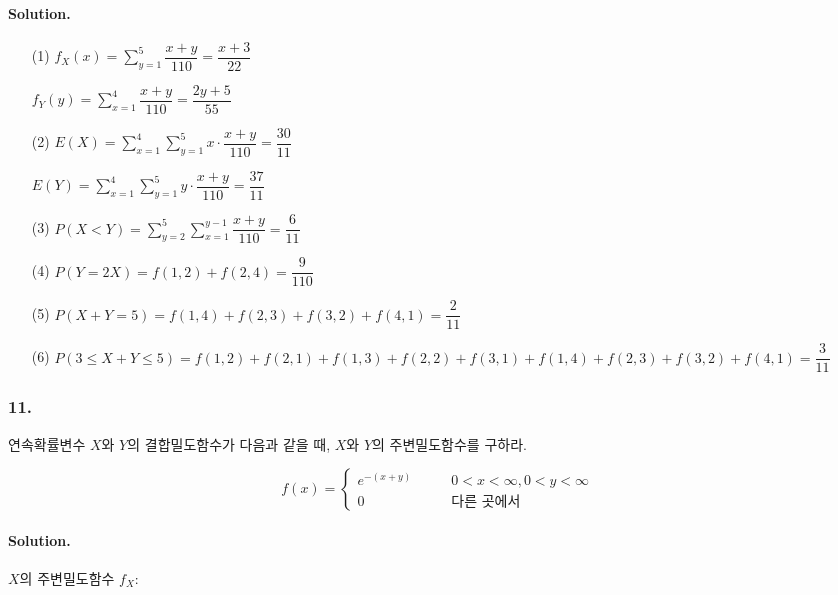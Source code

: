\paragraph{Solution.}
\begin{itemize}
  \item [(1)] $\displaystyle f_X\left(x\right) = \sum_{y=1}^5 \dfrac{x+y}{110} = \dfrac{x+3}{22}$

$\displaystyle f_Y\left(y\right) = \sum_{x=1}^4 \dfrac{x+y}{110} = \dfrac{2y+5}{55}$

  \item [(2)] $\displaystyle E\left(X\right) = \sum_{x=1}^4 \sum_{y=1}^5 x\cdot\dfrac{x+y}{110} = \dfrac{30}{11}$

$\displaystyle E\left(Y\right) = \sum_{x=1}^4 \sum_{y=1}^5 y\cdot\dfrac{x+y}{110} = \dfrac{37}{11}$

  \item [(3)] $\displaystyle P\left(X<Y\right) = \sum_{y=2}^5 \sum_{x=1}^{y - 1} \dfrac{x+y}{110} = \dfrac{6}{11}$
  \item [(4)] $\displaystyle P\left(Y=2X\right) = f\left(1, 2\right) + f\left(2, 4\right) = \dfrac{9}{110}$
  \item [(5)] $P\left(X+Y=5\right) = f\left(1, 4\right) + f\left(2, 3\right) + f\left(3, 2\right) + f\left(4, 1\right) = \dfrac{2}{11}$
  \item [(6)] $P\left(3\leq X+Y\leq 5\right) = f\left(1, 2\right) + f\left(2, 1\right) + f\left(1, 3\right) + f\left(2, 2\right) + f\left(3, 1\right) + f\left(1, 4\right) + f\left(2, 3\right) + f\left(3, 2\right) + f\left(4, 1\right) = \dfrac{3}{11}$
\end{itemize}


\subsubsection{11.} 연속확률변수 $X$와 $Y$의 결합밀도함수가 다음과 같을 때, $X$와 $Y$의 주변밀도함수를 구하라.

\[f\left(x\right) = \left\{
\begin{array}{ll}
	e^{-\left(x + y\right)} & \qquad 0<x<\infty, 0<y<\infty \\
	0 & \qquad\textrm{다른 곳에서}
\end{array}
\right. \]

\paragraph{Solution.} $X$의 주변밀도함수 $f_X$:

